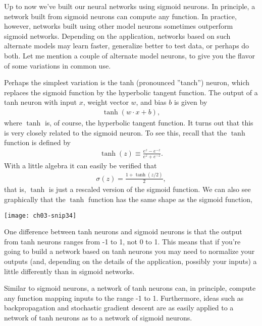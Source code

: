 Up to now we've built our neural networks using sigmoid neurons. In principle, a network built from sigmoid neurons can compute any function. In practice, however, networks built using other model neurons sometimes outperform sigmoid networks. Depending on the application, networks based on such alternate models may learn faster, generalize better to test data, or perhaps do both. Let me mention a couple of alternate model neurons, to give you the flavor of some variations in common use.

Perhaps the simplest variation is the tanh (pronounced ''tanch'') neuron, which replaces the sigmoid function by the hyperbolic tangent function. The output of a tanh neuron with input $x$, weight vector $w$, and bias $b$ is given by 
\begin{eqnarray} 
    \tanh(w \cdot x+b), 
    \label{eq:c03-109}
\end{eqnarray} 
where $\tanh$ is, of course, the hyperbolic tangent function. It turns out that this is very closely related to the sigmoid neuron. To see this, recall that the $\tanh$ function is defined by
\begin{eqnarray} 
\tanh(z) \equiv \frac{e^z-e^{-z}}{e^z+e^{-z}}. 
\label{eq:c03-110}
\end{eqnarray} 
With a little algebra it can easily be verified that 
\begin{eqnarray} 
\sigma(z) = \frac{1+\tanh(z/2)}{2}, 
\label{eq:c03-111}
\end{eqnarray} 
that is, $\tanh$ is just a rescaled version of the sigmoid function. We can also see graphically that the $\tanh$ function has the same shape as the sigmoid function,

\begin{marginfigure}
    \texttt{[image: ch03-snip34]}
    \end{marginfigure}

    
    One difference between tanh neurons and sigmoid neurons is that the output from tanh neurons ranges from -1 to 1, not 0 to 1. This means that if you're going to build a network based on tanh neurons you may need to normalize your outputs (and, depending on the details of the application, possibly your inputs) a little differently than in sigmoid networks.
    
    Similar to sigmoid neurons, a network of tanh neurons can, in principle, compute any function mapping inputs to the range -1 to 1. Furthermore, ideas such as backpropagation and stochastic gradient descent are as easily applied to a network of tanh neurons as to a network of sigmoid neurons.

